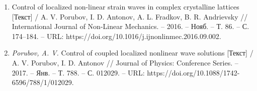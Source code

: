 \begin{frame}
\begin{tiny}
\begin{enumerate}
			\item Control of localized non-linear strain waves in complex crystalline lattices [Текст] / A. V. Porubov, I. D. Antonov, A. L. Fradkov, B. R. Andrievsky // International Journal of Non-Linear Mechanics. -- 2016. -- Нояб. -- Т. 86. -- С. 174--184. -- URL: https://doi.org/10.1016/j.ijnonlinmec.2016.09.002.
			
			\item \textit{Porubov, A. V.} Control of coupled localized nonlinear wave solutions [Текст] / A. V. Porubov, I. D. Antonov // Journal of Physics: Conference Series. -- 2017. -- Янв. -- Т. 788. -- С. 012029. -- URL: https://doi.org/10.1088/1742-6596/788/1/012029.
			
		\end{enumerate}
	\end{tiny}
\end{frame}


